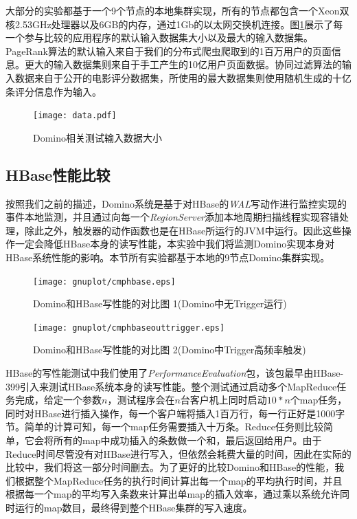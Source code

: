 大部分的实验都基于一个9个节点的本地集群实现，所有的节点都包含一个Xeon双核2.53GHz处理器以及6GB的内存，通过1Gb的以太网交换机连接。图\ref{fig:data}展示了每一个参与比较的应用程序的默认输入数据集大小以及最大的输入数据集。PageRank算法的默认输入来自于我们的分布式爬虫爬取到的1百万用户的页面信息。更大的输入数据集则来自于手工产生的10亿用户页面数据。协同过滤算法的输入数据来自于公开的电影评分数据集，所使用的最大数据集则使用随机生成的十亿条评分信息作为输入。

\begin{figure}[h!]
\centering
\texttt{[image: data.pdf]}
\caption{Domino相关测试输入数据大小}
\label{fig:data}
\end{figure}

\subsection{HBase性能比较}

按照我们之前的描述，Domino系统是基于对HBase的\textit{WAL}写动作进行监控实现的事件本地监测，并且通过向每一个\textit{RegionServer}添加本地周期扫描线程实现容错处理，除此之外，触发器的动作函数也是在HBase所运行的JVM中运行。因此这些操作一定会降低HBase本身的读写性能，本实验中我们将监测Domino实现本身对HBase系统性能的影响。本节所有实验都基于本地的9节点Domino集群实现。


\begin{figure}[h!]
  \centering
  \texttt{[image: gnuplot/cmphbase.eps]}
  \caption{Domino和HBase写性能的对比图 1(Domino中无Trigger运行)}
  \label{cmphbase}
\end{figure}

\begin{figure}[h!]
  \centering
  \texttt{[image: gnuplot/cmphbaseouttrigger.eps]}
  \caption{Domino和HBase写性能的对比图 2(Domino中Trigger高频率触发)}
  \label{cmphbase1}
\end{figure}

HBase的写性能测试中我们使用了\textit{PerformanceEvaluation}\cite{hbaseperformance}包，该包最早由HBase-399引入来测试HBase系统本身的读写性能。整个测试通过启动多个MapReduce任务完成，给定一个参数$n$，测试程序会在$n$台客户机上同时启动$10*n$个map任务，同时对HBase进行插入操作，每一个客户端将插入1百万行，每一行正好是1000字节。简单的计算可知，每一个map任务需要插入十万条。Reduce任务则比较简单，它会将所有的map中成功插入的条数做一个和，最后返回给用户。由于Reduce时间尽管没有对HBase进行写入，但依然会耗费大量的时间，因此在实际的比较中，我们将这一部分时间删去。为了更好的比较Domino和HBase的性能，我们根据整个MapReduce任务的执行时间计算出每一个map的平均执行时间，并且根据每一个map的平均写入条数来计算出单map的插入效率，通过乘以系统允许同时运行的map数目，最终得到整个HBase集群的写入速度。

